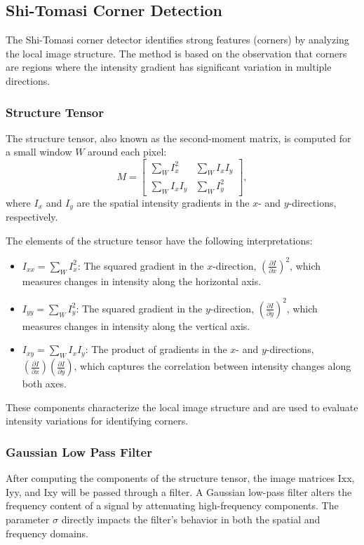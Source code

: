 \documentclass[11pt, conference, letterpaper]{IEEEtran}
\begin{document}

\subsection{Shi-Tomasi Corner Detection}
The Shi-Tomasi corner detector identifies strong features (corners) by analyzing the local image structure. The method is based on the observation that corners are regions where the intensity gradient has significant variation in multiple directions.

\subsubsection{Structure Tensor}
The structure tensor, also known as the second-moment matrix, is computed for a small window \(W\) around each pixel:
\begin{equation}
M = \begin{bmatrix}
\sum_W I_x^2 & \sum_W I_x I_y \\
\sum_W I_x I_y & \sum_W I_y^2
\end{bmatrix},
\end{equation}
where \(I_x\) and \(I_y\) are the spatial intensity gradients in the \(x\)- and \(y\)-directions, respectively.

The elements of the structure tensor have the following interpretations:
\begin{itemize}
    \item \(I_{xx} = \sum_W I_x^2\): The squared gradient in the \(x\)-direction, \((\frac{\partial I}{\partial x})^2\), which measures changes in intensity along the horizontal axis.
    \item \(I_{yy} = \sum_W I_y^2\): The squared gradient in the \(y\)-direction, \((\frac{\partial I}{\partial y})^2\), which measures changes in intensity along the vertical axis.
    \item \(I_{xy} = \sum_W I_x I_y\): The product of gradients in the \(x\)- and \(y\)-directions, \((\frac{\partial I}{\partial x})(\frac{\partial I}{\partial y})\), which captures the correlation between intensity changes along both axes.
\end{itemize}

These components characterize the local image structure and are used to evaluate intensity variations for identifying corners. 
\bigskip

\subsubsection{Gaussian Low Pass Filter}
After computing the components of the structure tensor, the image matrices Ixx, Iyy, and Ixy will be passed through a filter. A Gaussian low-pass filter alters the frequency content of a signal by attenuating high-frequency components. The parameter \(\sigma\) directly impacts the filter's behavior in both the spatial and frequency domains.
\end{document}
